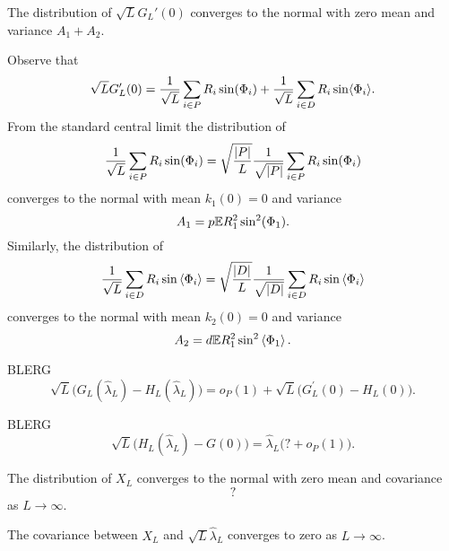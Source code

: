 \documentclass[journal]{IEEEtran}
\begin{document}
\begin{lemma}\label{lem:convdistGLdash}
The distribution of $\sqrt{L}G_L'(0)$ converges to the normal with zero mean and variance $A_1 + A_2$.
\end{lemma}
\begin{IEEEproof}
Observe that 
\[
\sqrt{L} G_L^\prime(0) = \frac{1}{\sqrt{L}} \sum_{i \in P} R_i \sin(\Phi_i) + \frac{1}{\sqrt{L}} \sum_{i \in D} R_i \sin\langle \Phi_i \rangle.
\]
From the standard central limit the distribution of
\[
\frac{1}{\sqrt{L}} \sum_{i \in P} R_i \sin(\Phi_i) = \sqrt{\frac{{\left\vert P \right\vert}}{L}} \frac{1}{\sqrt{{\left\vert P \right\vert}}} \sum_{i \in P} R_i \sin(\Phi_i) 
\]
converges to the normal with mean $k_1(0) = 0$ and variance 
\[
A_1 = p {\mathbb E} R_1^2 \sin^2(\Phi_1).
\]
Similarly, the distribution of 
\[
\frac{1}{\sqrt{L}} \sum_{i \in D} R_i \sin\left\langle \Phi_i \right\rangle = \sqrt{\frac{{\left\vert D \right\vert}}{L}} \frac{1}{\sqrt{{\left\vert D \right\vert}}} \sum_{i \in D} R_i \sin\left\langle \Phi_i \right\rangle 
\]
converges to the normal with mean $k_2(0) = 0$ and variance
\[
A_2 = d {\mathbb E} R_1^2 \sin^2\left\langle \Phi_1 \right\rangle.
\]
\end{IEEEproof}


\begin{lemma}\label{lem:empiricprocforrho} BLERG
\[
\sqrt{L}\big( G_L(\hat{\lambda}_L) - H_L(\hat{\lambda}_L) \big) = o_P(1) + \sqrt{L} \big( G_L^\prime(0) - H_L(0) \big).
\]
\end{lemma}
\begin{IEEEproof}
\end{IEEEproof}

\begin{lemma}\label{lem:HLtoG} BLERG
\[
\sqrt{L}\big( H_L(\hat{\lambda}_L) - G(0) \big) = \hat{\lambda}_L \big( ? + o_P(1) \big).
\]
\end{lemma}
\begin{IEEEproof}
\end{IEEEproof}

\begin{lemma}\label{lem:XL} 
The distribution of $X_L$ converges to the normal with zero mean and covariance
\[
?
\]
as $L \rightarrow\infty$.
\end{lemma}
\begin{IEEEproof}

\end{IEEEproof}

\begin{lemma}\label{lem:XLcovlambdaL} 
The covariance between $X_L$ and $\sqrt{L}\hat{\lambda}_L$ converges to zero as $L\rightarrow\infty$.
\end{lemma}
\begin{IEEEproof}

\end{IEEEproof}
\end{document}
